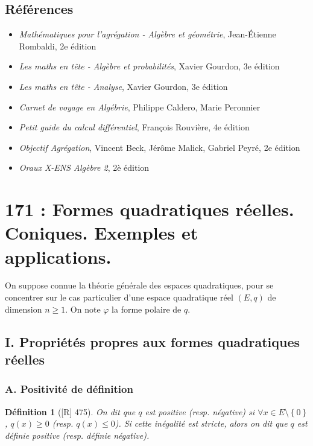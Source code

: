 \documentclass[10pt, a4paper, parskip=full, twoside, twocolumn]{report}
\newtheorem{definition}{Définition}
\begin{document}
\section*{Références}
\begin{itemize}
	\item[R] \emph{Mathématiques pour l'agrégation - Algèbre et géométrie}, Jean-Étienne Rombaldi, 2e édition
	\item[Go] \emph{Les maths en tête - Algèbre et probabilités}, Xavier Gourdon, 3e édition
	\item[Go'] \emph{Les maths en tête - Analyse}, Xavier Gourdon, 3e édition
	\item[C] \emph{Carnet de voyage en Algébrie}, Philippe Caldero, Marie Peronnier
	\item[Rv] \emph{Petit guide du calcul différentiel}, François Rouvière, 4e édition
	\item[BMP] \emph{Objectif Agrégation}, Vincent Beck, Jérôme Malick, Gabriel Peyré, 2e édition
	\item[FGN] \emph{Oraux X-ENS Algèbre 2}, 2è édition 
\end{itemize}




\chapter*{171 : Formes quadratiques réelles. Coniques. Exemples et applications.}
\setcounter{definition}{0}

\textcolor{paragraphtext}{On suppose connue la théorie générale des espaces quadratiques, pour se concentrer sur le cas particulier d'une espace quadratique réel $(E,q)$ de dimension $n\geq 1$.
On note $\varphi$ la forme polaire de $q$.}

\section*{I. Propriétés propres aux formes quadratiques réelles}
\subsection*{A. Positivité de définition}

\begin{definition}[\textnormal{[R] 475}]
	On dit que $q$ est \emph{positive} (resp. \emph{négative}) si $\forall x\in E\setminus\left\{0\right\}$, $q(x)\geq 0$ (resp. $q(x)\leq 0$).
	Si cette inégalité est stricte, alors on dit que $q$ est \emph{définie positive} (resp. \emph{définie négative}).
\end{definition}
\end{document}
